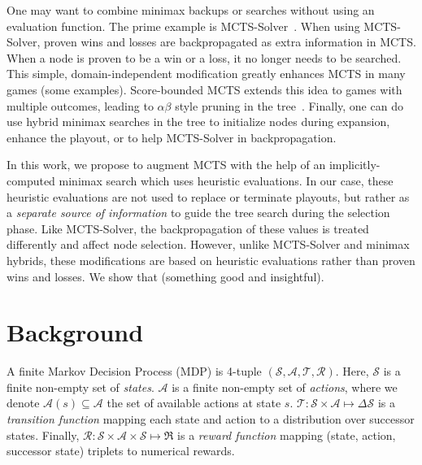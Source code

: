 \documentclass{article}
\newcommand{\cA}{\mathcal{A}}
\newcommand{\cR}{\mathcal{R}}
\newcommand{\cS}{\mathcal{S}}
\newcommand{\cT}{\mathcal{T}}
\newcommand{\marcl}[1]{\textbf{\color{red} /* #1 (marcl) */}}
\begin{document}

One may want to combine minimax backups or searches without using an evaluation function. 
The prime example is MCTS-Solver~\cite{Winands08Solver}. When using 
MCTS-Solver, proven wins and losses are backpropagated as extra information in MCTS. When a node is proven to be a 
win or a loss, it no longer needs to be searched. This simple, domain-independent modification greatly enhances 
MCTS in many games (some examples). Score-bounded MCTS extends this idea to games with multiple outcomes, 
leading to $\alpha \beta$ style pruning in the tree~\cite{Cazenave10ScoreBounded}. Finally, one can do use hybrid
minimax searches in the tree to initialize nodes during expansion, enhance the playout, or to help MCTS-Solver 
in backpropagation. 

In this work, we propose to augment MCTS with the help of an implicitly-computed minimax search which uses
heuristic evaluations. In our case, these heuristic evaluations are not used to replace or terminate playouts, but 
rather as a {\it separate source of information} to guide the tree search during the selection phase. Like MCTS-Solver, 
the backpropagation of these values is treated differently and affect node selection. However, unlike MCTS-Solver and 
minimax hybrids, these modifications are based on heuristic evaluations rather than proven wins and losses. 
We show that (something good and insightful). 

\section{Background}


A finite Markov Decision Process (MDP) is 4-tuple $(\cS, \cA, \cT, \cR)$. Here, $\cS$ is a finite non-empty set of {\it states}. 
$\cA$ is a finite non-empty set of {\it actions}, where we denote $\cA(s) \subseteq \cA$ the set of available actions at state $s$. 
$\cT : \cS \times \cA \mapsto \Delta \cS$ is a {\it transition function} mapping 
each state and action to a distribution over successor states. Finally, $\cR : \cS \times \cA \times \cS \mapsto \Re$ 
is a {\it reward function} mapping (state, action, successor state) triplets to numerical rewards. 
\end{document}
